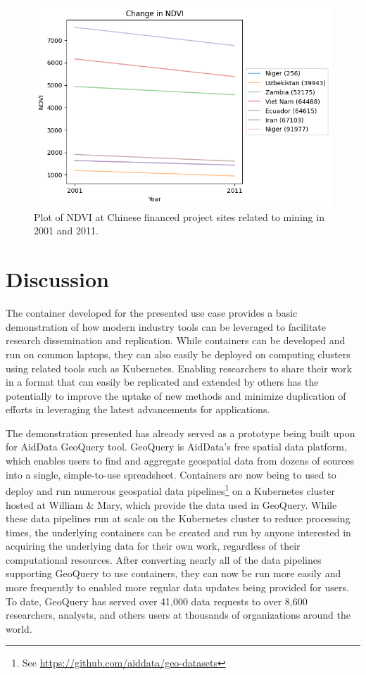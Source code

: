 \documentclass[a4paper]{article}
\begin{document}
\begin{figure}
    \centering
    \includegraphics[width=0.8\linewidth]{report/ndvi.png}
    \caption{Plot of NDVI at Chinese financed project sites related to mining in 2001 and 2011.}
    \label{fig:ndvi}
\end{figure}



\section{Discussion}

The container developed for the presented use case provides a basic demonstration of how modern industry tools can be leveraged to facilitate research dissemination and replication. While containers can be developed and run on common laptops, they can also easily be deployed on computing clusters using related tools such as Kubernetes. Enabling researchers to share their work in a format that can easily be replicated and extended by others has the potentially to improve the uptake of new methods and minimize duplication of efforts in leveraging the latest advancements for applications.

The demonstration presented has already served as a prototype being built upon for AidData GeoQuery tool. GeoQuery is AidData's free spatial data platform, which enables users to find and aggregate geospatial data from dozens of sources into a single, simple-to-use spreadsheet\citep{Goodman2019}. Containers are now being to used to deploy and run numerous geospatial data pipelines\footnote{See \url{https://github.com/aiddata/geo-datasets}} on a Kubernetes cluster hosted at William \& Mary, which provide the data used in GeoQuery. While these data pipelines run at scale on the Kubernetes cluster to reduce processing times, the underlying containers can be created and run by anyone interested in acquiring the underlying data for their own work, regardless of their computational resources. After converting nearly all of the data pipelines supporting GeoQuery to use containers, they can now be run more easily and more frequently to enabled more regular data updates being provided for users. To date, GeoQuery has served over 41,000 data requests to over 8,600 researchers, analysts, and others users at thousands of organizations around the world. 
\end{document}
